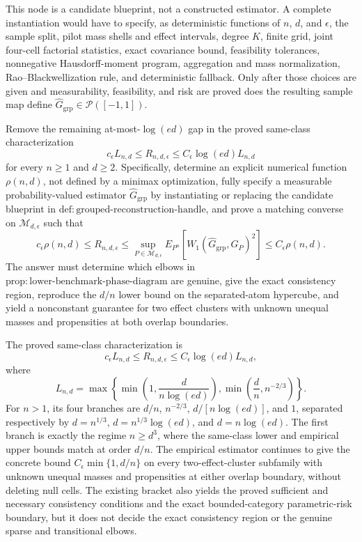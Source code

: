 This node is a candidate blueprint, not a constructed estimator.  A complete instantiation would have to specify, as deterministic functions of \(n\), \(d\), and \(\epsilon\), the sample split, pilot mass shells and effect intervals, degree \(K\), finite grid, joint four-cell factorial statistics, exact covariance bound, feasibility tolerances, nonnegative Hausdorff-moment program, aggregation and mass normalization, Rao--Blackwellization rule, and deterministic fallback.  Only after those choices are given and measurability, feasibility, and risk are proved does the resulting sample map define \(\widehat G_{\mathrm{grp}}\in\mathcal P([-1,1])\).

Remove the remaining at-most-\(\log(ed)\) gap in the proved same-class characterization
\[
 c_\epsilon L_{n,d}\leq R_{n,d,\epsilon}
 \leq C_\epsilon\log(ed)L_{n,d}
\]
for every \(n\geq1\) and \(d\geq2\).  Specifically, determine an explicit numerical function \(\rho(n,d)\), not defined by a minimax optimization, fully specify a measurable probability-valued estimator \(\widehat G_{\mathrm{grp}}\) by instantiating or replacing the candidate blueprint in \(\mathrm{def:grouped\mbox{-}reconstruction\mbox{-}handle}\), and prove a matching converse on \(\mathcal M_{d,\epsilon}\) such that
\[
 c_\epsilon\rho(n,d)\leq R_{n,d,\epsilon}
 \leq \sup_{P\in\mathcal M_{d,\epsilon}}
 E_{P^n}\!\left[W_1(\widehat G_{\mathrm{grp}},G_P)^2\right]
 \leq C_\epsilon\rho(n,d).
\]
The answer must determine which elbows in \(\mathrm{prop:lower\mbox{-}benchmark\mbox{-}phase\mbox{-}diagram}\) are genuine, give the exact consistency region, reproduce the \(d/n\) lower bound on the separated-atom hypercube, and yield a nonconstant guarantee for two effect clusters with unknown unequal masses and propensities at both overlap boundaries.

The proved same-class characterization is
\[
 c_\epsilon L_{n,d}\leq R_{n,d,\epsilon}
 \leq C_\epsilon\log(ed)L_{n,d},
\]
where
\[
 L_{n,d}=\max\!\left\{
 \min\!\left(1,\frac{d}{n\log(ed)}\right),
 \min\!\left(\frac dn,n^{-2/3}\right)
 \right\}.
\]
For \(n>1\), its four branches are \(d/n\), \(n^{-2/3}\), \(d/[n\log(ed)]\), and \(1\), separated respectively by \(d=n^{1/3}\), \(d=n^{1/3}\log(ed)\), and \(d=n\log(ed)\).  The first branch is exactly the regime \(n\geq d^3\), where the same-class lower and empirical upper bounds match at order \(d/n\).  The empirical estimator continues to give the concrete bound \(C_\epsilon\min\{1,d/n\}\) on every two-effect-cluster subfamily with unknown unequal masses and propensities at either overlap boundary, without deleting null cells.  The existing bracket also yields the proved sufficient and necessary consistency conditions and the exact bounded-category parametric-risk boundary, but it does not decide the exact consistency region or the genuine sparse and transitional elbows.
